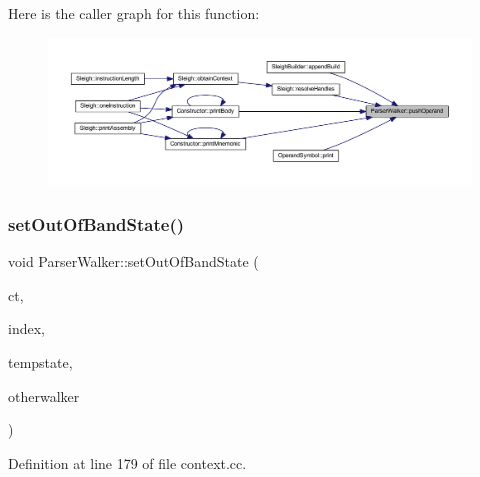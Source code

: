Here is the caller graph for this function\+:
\nopagebreak
\begin{figure}[H]
\begin{center}
\leavevmode
\includegraphics[width=350pt]{class_parser_walker_a0935e6c14cfdcb9657a440cef7ee40ef_icgraph}
\end{center}
\end{figure}
\mbox{\label{class_parser_walker_a917b2a69e5a2d62857666389d95bf757}} 
\subsubsection{\texorpdfstring{setOutOfBandState()}{setOutOfBandState()}}
{\footnotesize\ttfamily void Parser\+Walker\+::set\+Out\+Of\+Band\+State (\begin{DoxyParamCaption}\item[{\mbox{\hyperlink{class_constructor}{Constructor}} $\ast$}]{ct,  }\item[{int4}]{index,  }\item[{\mbox{\hyperlink{struct_construct_state}{Construct\+State}} $\ast$}]{tempstate,  }\item[{const \mbox{\hyperlink{class_parser_walker}{Parser\+Walker}} \&}]{otherwalker }\end{DoxyParamCaption})}



Definition at line 179 of file context.\+cc.

